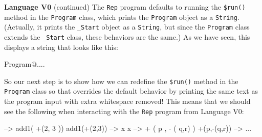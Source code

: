 \begin{minipage}[t]{\sw}
\slidenumber
\LARGE
{\bf Language V0} (continued)\exx
The \verb'Rep' program defaults to running
the \verb'$run()' method in the \verb'Program' class,
which prints the \verb'Program' object as a \verb'String'.
(Actually, it prints the \verb'_Start' object as a \verb'String',
but since the \verb'Program' class extends the \verb'_Start' class,
these behaviors are the same.)
As we have seen, this displays a string that looks like this:
{\Large
\begin{qv}
Program@....
\end{qv}
}
So our next step is to show how we can redefine the \verb'$run()' method
in the \verb'Program' class
so that overrides the default behavior
by printing the same text as the program input
with extra whitespace removed!\exx
This means that we should see the following when interacting
with the \verb'Rep' program from Language V0:
{\Large
\begin{qv}
--> add1( +(2, 3   ))
add1(+(2,3))
--> x
x
--> +  ( p  ,
- ( q,r)  )
+(p,-(q,r))
--> ...
\end{qv}
}
\end{minipage}
\clearpage
